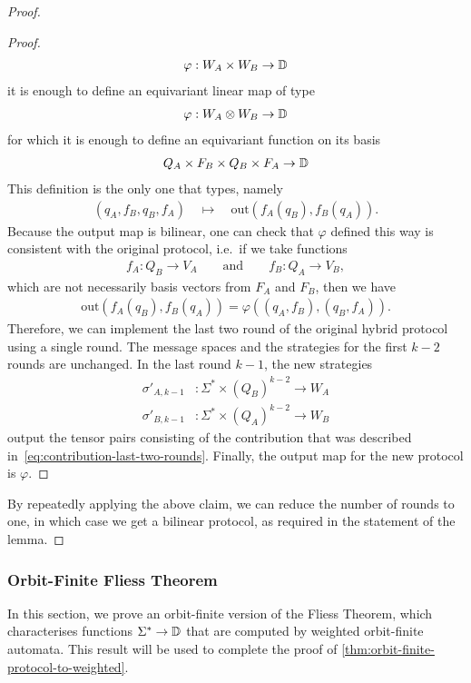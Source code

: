 \begin{proof}
\begin{proof}
\begin{align*}
        \varphi : W_A \times W_B \to \mathbb D
        \end{align*}
        it is enough to define an equivariant linear map of type 
        \begin{align*}
        \varphi : W_A \otimes W_B \to \mathbb D
        \end{align*}
        for which it is enough to define an equivariant function on its basis
        \begin{align*}
        Q_A \times F_B \times Q_B \times F_A \to \mathbb D
        \end{align*}
        This definition is the only one that types, namely 
        \begin{align*}
        (q_A, f_B, q_B, f_A) \quad 
        \mapsto \quad 
        \text{out}(f_A(q_B), f_B(q_A)).
        \end{align*}
        Because the output map is bilinear, one can check that $\varphi$ defined this way is consistent with the original protocol, i.e.~if we take functions 
        \begin{align*}
        f_A : Q_B \to V_A \qquad \text{and} \qquad f_B : Q_A \to V_B,
        \end{align*}
        which are not necessarily basis vectors from $F_A$ and $F_B$, then we have 
        \begin{align*}
        \text{out}(f_A(q_B), f_B(q_A)) = \varphi((q_A, f_B), (q_B, f_A)).
        \end{align*}
        Therefore, we can implement the last two round of the original hybrid protocol using a single round. The message spaces and the strategies for the first $k-2$ rounds are unchanged. In the last round $k-1$, the new strategies
        \begin{align*}
        \sigma'_{A,k-1} & : \Sigma^* \times (Q_B)^{k-2} \to W_A\\
        \sigma'_{B,k-1} & : \Sigma^* \times (Q_A)^{k-2} \to W_B
        \end{align*}
        output the tensor pairs consisting of the contribution that was described in~\eqref{eq:contribution-last-two-rounds}. Finally, the output  map for the new protocol is $\varphi$. 
    \end{proof}

    By repeatedly applying the above claim, we can reduce the number of rounds to one, in which case we get a bilinear protocol, as required in the statement of the lemma. 
\end{proof}


\subsubsection{Orbit-Finite Fliess Theorem}
In this section, we prove an orbit-finite version of the Fliess Theorem, which characterises functions $\Sigma^* \to \mathbb D$ that are computed by weighted orbit-finite automata. This result will be used to complete the proof of \cref{thm:orbit-finite-protocol-to-weighted}.

